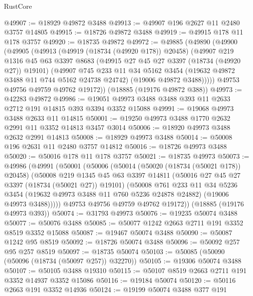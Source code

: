 \begin{lexlean}{RustCore}
\begin{coremodule}
@49907 := @18929 @49872 @3488
@49913 := @49907 @196 @2627 @11 @2480 @3757 @14805
@49915 := @18726 @49872 @3488
@49919 := @49915 @178 @11 @178 @3757
@49920 := @18735 @49872
@49972 := @49885
    (@49890
      (@49900
        (@49905
          (@49913
            (@49919 (@18734 (@49920 @178)) @20458)
            (@49907
              @219
              @1316
              @45
              @63
              @3397
              @8683
              (@49915 @27 @45 @27 @3397 (@18734 (@49920 @27)) @19101)
              (@49907
                @745
                @233
                @11
                @34
                @5162
                @3454
                (@19632 @49872 @3488 @11 @744 @5162 @24738 @24742)
                (@19006 @49872 @3488)))))
        @49753
        @49756
        @49759
        @49762
        @19172))
    (@18885 (@19176 @49872 @388))
@49973 := @42283 @49872
@49986 := @19051 @49973 @3488 @3488 @393 @11 @2633 @2712 @191 @14815 @393 @3394 @3352 @15088
@49991 := @19068 @49973 @3488 @2633 @11 @14815
@50001 := @19250 @49973 @3488 @1770 @2632 @2991 @11 @3352 @14813 @3457 @3014
@50006 := @18920 @49973 @3488 @2632 @2991 @14813
@50008 := @18929 @49973 @3488
@50014 := @50008 @196 @2631 @11 @2480 @3757 @14812
@50016 := @18726 @49973 @3488
@50020 := @50016 @178 @11 @178 @3757
@50021 := @18735 @49973
@50073 := @49986
    (@49991
      (@50001
        (@50006
          (@50014
            (@50020 (@18734 (@50021 @178)) @20458)
            (@50008
              @219
              @1345
              @45
              @63
              @3397
              @14811
              (@50016 @27 @45 @27 @3397 (@18734 (@50021 @27)) @19101)
              (@50008
                @761
                @233
                @11
                @34
                @5236
                @3454
                (@19632 @49973 @3488 @11 @760 @5236 @24878 @24882)
                (@19006 @49973 @3488)))))
        @49753
        @49756
        @49759
        @49762
        @19172))
    (@18885 (@19176 @49973 @393))
@50074 := @31793 @49973
@50076 := @19235 @50074 @3488
@50077 := @50076 @3488
@50085 := @50077 @1242 @2663 @2711 @191 @3352 @8519 @3352 @15088
@50087 := @19467 @50074 @3488
@50090 := @50087 @1242 @95 @8519
@50092 := @18726 @50074 @3488
@50096 := @50092 @257 @95 @257 @8519
@50097 := @18735 @50074
@50103 := @50085 (@50090 (@50096 (@18734 (@50097 @257)) @32270))
@50105 := @19306 @50074 @3488
@50107 := @50105 @3488 @19310
@50115 := @50107 @8519 @2663 @2711 @191 @3352 @14937 @3352 @15086
@50116 := @19184 @50074
@50120 := @50116 @2663 @191 @3352 @14936
@50124 := @19199 @50074 @3488 @377 @191

\end{coremodule}
\end{lexlean}
